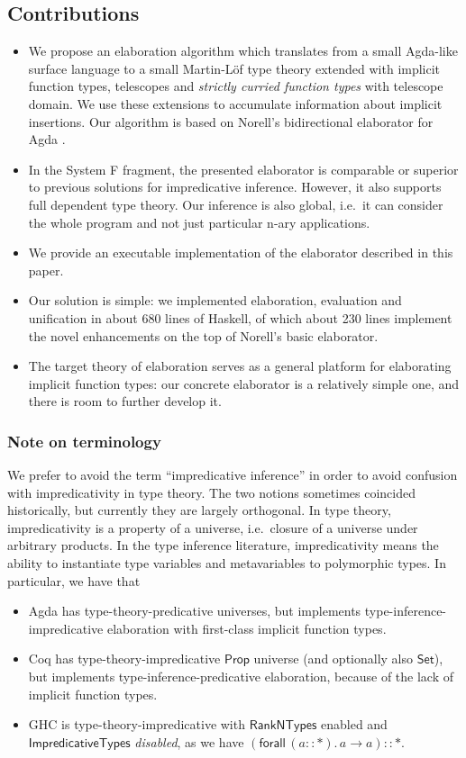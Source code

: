 \documentclass[acmsmall,review,anonymous,prologue,dvipsnames]{acmart}\settopmatter{printfolios=true,printccs=false,printacmref=false}
\newcommand{\kw}[1]{{\mathsf{#1}}}
\theoremstyle{remark}
\begin{document}
\subsection{Contributions}
\begin{itemize}
  \item We propose an elaboration algorithm which translates from a small
    Agda-like surface language to a small Martin-L\"of type theory extended with
    implicit function types, telescopes and \emph{strictly curried function
      types} with telescope domain. We use these extensions to accumulate
    information about implicit insertions. Our algorithm is based on Norell's
    bidirectional elaborator for Agda \cite[Chapter~3]{norell07thesis}.
  \item
    In the System F fragment, the presented elaborator is comparable or superior
    to previous solutions for impredicative inference. However, it also supports
    full dependent type theory. Our inference is also global, i.e.\ it can
    consider the whole program and not just particular n-ary applications.
  \item We provide an executable implementation of the elaborator described in
    this paper.
  \item Our solution is simple: we implemented elaboration, evaluation and
    unification in about 680 lines of Haskell, of which about 230 lines
    implement the novel enhancements on the top of Norell's basic elaborator.
  \item The target theory of elaboration serves as a general platform for
    elaborating implicit function types: our concrete elaborator is a relatively
    simple one, and there is room to further develop it.
\end{itemize}

\subsubsection{Note on terminology}

We prefer to avoid the term ``impredicative inference'' in order to avoid
confusion with impredicativity in type theory. The two notions sometimes
coincided historically, but currently they are largely orthogonal. In type
theory, impredicativity is a property of a universe, i.e.\ closure of a universe
under arbitrary products. In the type inference literature, impredicativity
means the ability to instantiate type variables and metavariables to polymorphic
types. In particular, we have that
\begin{itemize}
  \item Agda has type-theory-predicative universes, but implements
    type-inference-impredicative elaboration with first-class implicit function
    types.
  \item Coq has type-theory-impredicative $\kw{Prop}$ universe (and optionally
    also $\kw{Set}$), but implements type-inference-predicative elaboration,
    because of the lack of implicit function types.
  \item GHC is type-theory-impredicative with $\kw{RankNTypes}$ enabled and
    $\kw{ImpredicativeTypes}$ \emph{disabled}, as we have $(\kw{forall}\,(a :: *).\, a
    \to a) :: *$.
\end{itemize}
\end{document}
